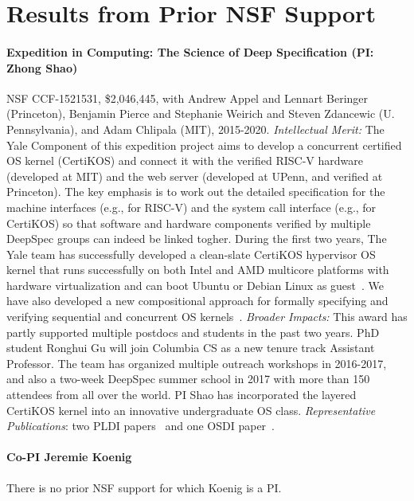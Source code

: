 
\section{Results from Prior NSF Support}
\label{ssec:prior}

\paragraph{Expedition in Computing: The Science of Deep Specification (PI: Zhong Shao)} 
NSF CCF-1521531, \$2,046,445, with Andrew Appel and Lennart Beringer
(Princeton), Benjamin Pierce and Stephanie Weirich and Steven
Zdancewic (U. Pennsylvania), and Adam Chlipala (MIT), 2015-2020.  {\em
  Intellectual Merit:} The Yale Component of this expedition project
aims to develop a concurrent certified OS kernel (CertiKOS) and
connect it with the verified RISC-V hardware (developed at MIT) and
the web server (developed at UPenn, and verified at Princeton). The
key emphasis is to work out the detailed specification for the machine
interfaces (e.g., for RISC-V) and the system call interface (e.g., for
CertiKOS) so that software and hardware components verified by
multiple DeepSpec groups can indeed be linked togher. During the first
two years, The Yale team has successfully developed a clean-slate
CertiKOS hypervisor OS kernel that runs successfully on both Intel and
AMD multicore platforms with hardware virtualization and can boot
Ubuntu or Debian Linux as guest~\cite{certikos16}.  We have also
developed a new compositional approach for formally specifying and
verifying sequential and concurrent OS
kernels~\cite{chen16,costanzo16,certikos16}.  {\em Broader Impacts:}
This award has partly supported multiple postdocs and students in the
past two years. PhD student Ronghui Gu will join Columbia CS as a new
tenure track Assistant Professor.  The team has organized multiple
outreach workshops in 2016-2017, and also a two-week DeepSpec summer
school in 2017 with more than 150 attendees from all over the
world. PI Shao has incorporated the layered CertiKOS kernel into an
innovative undergraduate OS class.  {\em Representative Publications}:
two PLDI papers~\cite{chen16,costanzo16} and one OSDI
paper~\cite{certikos16}.

\paragraph{Co-PI Jeremie Koenig}
There is no prior NSF support for which Koenig is a PI.

